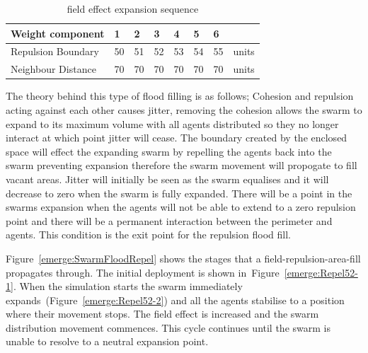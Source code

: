 \begin{table}[H]
\begin{center}
\begin{tabular}{| p{2cm} | p{0.6cm} | p{0.6cm} | p{0.6cm} | p{0.6cm} | p{0.6cm} | p{0.6cm} | p{1cm} |}
\hline
\bf Weight \bf component & \bf 1 & \bf 2 & \bf 3 & \bf 4 & \bf 5 & \bf 6 & \\ \hline
Repulsion Boundary & 50 & 51 & 52 & 53 & 54 & 55 & units\\  \hline
Neighbour Distance & 70 & 70 & 70 & 70 & 70 & 70 & units\\  \hline
\end{tabular}\caption{field effect expansion sequence} \label{tab:emerge:BaselineConcaveReduction}
\end{center}
\end{table}

The theory behind this type of flood filling is as follows; Cohesion and repulsion acting against each other causes jitter, removing the cohesion allows the swarm to expand to its maximum volume with all agents distributed so they no longer interact at which point jitter will cease. The boundary created by the enclosed space will effect the expanding swarm by repelling the agents back into the swarm preventing expansion therefore the swarm movement will propogate to fill vacant areas. Jitter will initially be seen as the swarm equalises and it will decrease to zero when the swarm is fully expanded. There will be a point in the swarms expansion when the agents will not be able to extend to a zero repulsion point and there will be a permanent interaction between the perimeter and agents. This condition is the exit point for the repulsion flood fill.

Figure~\ref{emerge:SwarmFloodRepel} shows the stages that a field-repulsion-area-fill propagates through. The initial deployment is shown in~Figure~\ref{emerge:Repel52-1}. When the simulation starts the swarm immediately expands~(Figure~\ref{emerge:Repel52-2}) and all the agents stabilise to a position where their movement stops. The field effect is increased and the swarm distribution movement commences. This cycle continues until the swarm is unable to resolve to a neutral expansion point.

